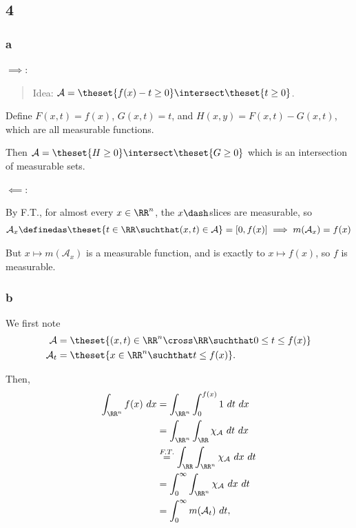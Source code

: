 \hypertarget{section-3}{%
\subsection{4}\label{section-3}}

\hypertarget{a-2}{%
\subsubsection{a}\label{a-2}}

\(\implies\):

\begin{quote}
Idea:
\(\mathcal{A} = \theset{f(x) - t \geq 0} \intersect \theset{t \geq 0}\).
\end{quote}

Define \(F(x, t) = f(x)\), \(G(x, t) = t\), and
\(H(x, y) = F(x, t) - G(x, t)\), which are all measurable functions.

Then \(\mathcal{A} = \theset{H \geq 0} \intersect \theset{G \geq 0}\)
which is an intersection of measurable sets.

\(\impliedby\):

By F.T., for almost every \(x\in \RR^n\), the \(x\dash\)slices are
measurable, so \begin{align*}
\mathcal{A}_x \definedas \theset{t\in \RR \suchthat (x, t) \in \mathcal{A}} = [0, f(x)] \implies m(\mathcal A_x) = f(x)
\end{align*}

But \(x \mapsto m(\mathcal A_x)\) is a measurable function, and is
exactly to \(x \mapsto f(x)\), so \(f\) is measurable.

\hypertarget{b-2}{%
\subsubsection{b}\label{b-2}}

We first note \begin{align*}
\mathcal{A} &= \theset{(x, t) \in \RR^n\cross \RR \suchthat 0 \leq t \leq f(x)} 
\\
\mathcal{A}_t &= \theset{x
\in \RR^n \suchthat t\leq f(x) }
.\end{align*}

Then, \begin{align*}
\int_{\RR^n} f(x) ~dx 
&= \int_{\RR^n} \int_0^{f(x)} 1 ~dt~dx \\
&= \int_{\RR^n} \int_{\RR} \chi_\mathcal{A} ~dt~dx \\
&\overset{F.T.}= \int_{\RR} \int_{\RR^n} \chi_\mathcal{A} ~dx~dt\\
&= \int_0^\infty \int_{\RR^n} \chi_\mathcal{A} ~dx~dt\\
&= \int_0^\infty m(\mathcal{A}_t) ~dt
,\end{align*}

